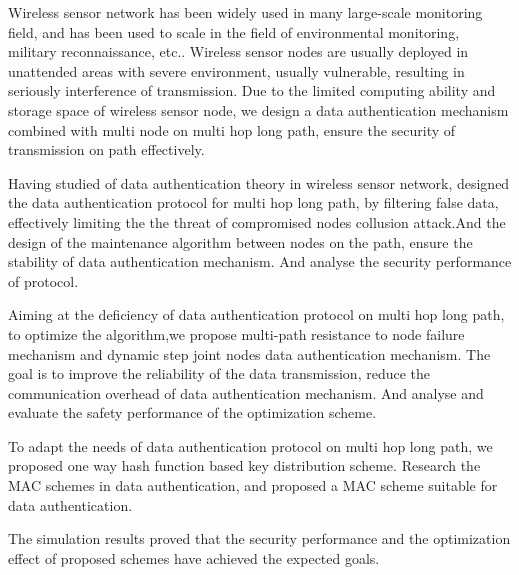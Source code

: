 \begin{eabstract}
Wireless sensor network has been widely used in many large-scale monitoring field, and has been used to scale in the field of environmental monitoring, military reconnaissance, etc.. Wireless sensor nodes are usually deployed in unattended areas with severe environment, usually vulnerable, resulting in seriously interference of transmission. Due to the limited computing ability and storage space of wireless sensor node, we design a data authentication
mechanism combined with multi node on multi hop long path, ensure the security of transmission on path effectively.

Having studied of data authentication theory in wireless sensor network, designed the data authentication protocol for multi hop long path, by filtering false data, effectively limiting the the threat of compromised nodes collusion attack.And the design of the maintenance algorithm between nodes on the path, ensure the stability of data authentication mechanism. And analyse the security performance of protocol.

Aiming at the deficiency of data authentication protocol on multi hop long path, to optimize the algorithm,we propose multi-path resistance to node failure mechanism and dynamic step joint nodes data authentication mechanism. The goal is to improve the reliability of the data transmission, reduce the communication overhead of data authentication mechanism. And analyse and evaluate the safety performance of the optimization scheme.

To adapt the needs of data authentication protocol on multi hop long path, we proposed one way hash function based key distribution scheme. Research the MAC schemes in data authentication, and proposed a MAC scheme suitable for data authentication.

The simulation results proved that the security performance and the optimization effect of proposed schemes have achieved the expected goals.

\end{eabstract}


